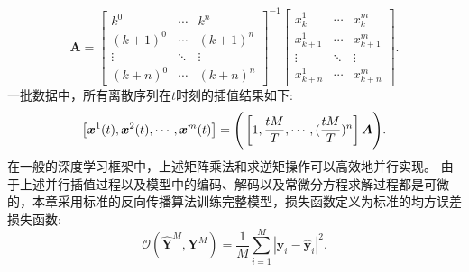 \begin{equation}
\boldsymbol{A}=\left[\begin{array}{ccc}
k^{0} & \cdots & k^{n} \\
(k+1)^0 & \cdots & (k+1)^{n} \\
\vdots & \ddots & \vdots \\
(k+n)^0 & \cdots & (k+n)^{n}
\end{array}\right]^{-1}\left[\begin{array}{ccc}
x_{k}^{1} & \cdots & x_{k}^{m} \\
x_{k+1}^{1} & \cdots & x_{k+1}^{m} \\
\vdots & \ddots & \vdots \\
x_{k+n}^{1} & \cdots & x_{k+n}^{m}
\end{array}\right].
\end{equation}
一批数据中，所有离散序列在$t$时刻的插值结果如下:
\begin{equation}
\left[\boldsymbol x^1(t),\boldsymbol x^2(t),\cdots,\boldsymbol x^m(t)\right]= \Bigg(\left[ 1, \frac{tM}{T},\cdots, (\frac{tM}{T})^n\right]\boldsymbol{A}\Bigg). 
\end{equation}
在一般的深度学习框架中，上述矩阵乘法和求逆矩操作可以高效地并行实现。
由于上述并行插值过程以及模型中的编码、解码以及常微分方程求解过程都是可微的，本章采用标准的反向传播算法训练完整模型，损失函数定义为标准的均方误差损失函数:
\begin{equation}
\label{equ:mse_loss}
\mathcal{O}\left(\hat{\boldsymbol Y}^M, \boldsymbol{Y}^M\right)=\frac{1}{M} \sum_{i=1}^{M}\left|\boldsymbol y_{i}-\hat{\boldsymbol y}_{i}\right|^2.
\end{equation}


